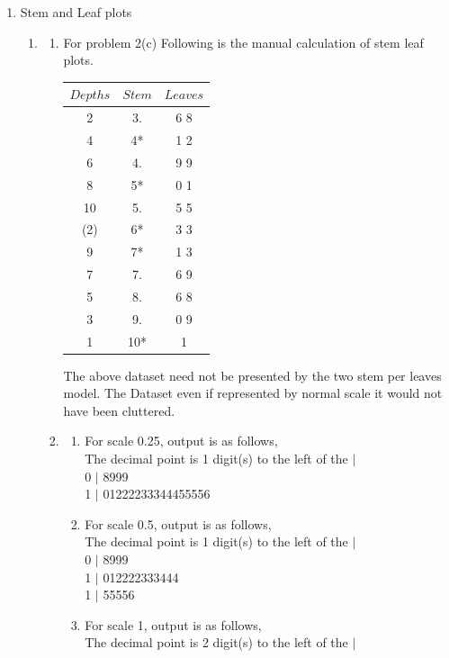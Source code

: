 \documentclass{article}
\begin{document}
\begin{enumerate}
\item Stem and Leaf plots
\begin{enumerate}
\item
\begin{enumerate}
\item
For problem 2(c) Following is the manual calculation of stem leaf plots.
\begin{center}
\begin{tabular}{|c  |c  |c|}
$Depths$ & $Stem$ & $Leaves$ \\ \hline
2&	3.&	6 8\\
4&4*&1 2\\
6&4.&9 9\\
8&5*&0 1\\
10&5.&5 5\\
(2)&6*& 3 3\\
9&7*&1 3\\
7&7.&6 9\\
5&8.&6 8\\
3&9.&0 9\\
1&10*&1\\ \hline
\end{tabular}
\end{center}
The above dataset need not be presented by the two stem per leaves model. The Dataset even if represented by normal scale it would not have been cluttered.
\item

\begin{enumerate}
\item For scale 0.25, output is as follows,\\
The decimal point is 1 digit(s) to the left of the $|$\\
  0 $|$ 8999\\
  1 $|$ 01222233344455556
\item For scale 0.5, output is as follows,\\
The decimal point is 1 digit(s) to the left of the $|$\\

  0 $|$ 8999\\
  1 $|$ 012222333444\\
  1 $|$ 55556\\
\item For scale 1, output is as follows,\\
The decimal point is 2 digit(s) to the left of the $|$\\


\end{enumerate}
\end{enumerate}
\end{enumerate}
\end{enumerate}
\end{document}
